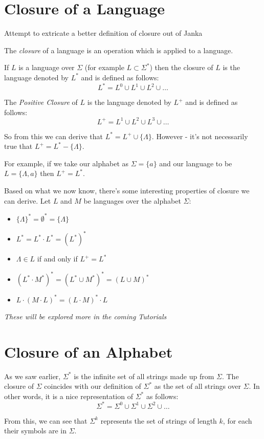 \section{Closure of a Language}
\begin{todo}
Attempt to extricate a better definition of closure out of Janka
\end{todo}

The \textit{closure} of a language is an operation which is applied to a language. 

If $L$ is a language over $\Sigma$ (for example $L \subset \Sigma^*$) then the closure of $L$ is the language denoted by $L^*$ and is defined as follows:
\[L^* = L^0 \cup L^1 \cup L^2 \cup \ldots\]

The \textit{Positive Closure} of $L$ is the language denoted by $L^+$ and is defined as follows:
\[L^+ = L^1 \cup L^2 \cup L^3 \cup \ldots\]

So from this we can derive that $L^* = L^+ \cup \{\Lambda\}$. However - it's not necessarily true that $L^+ = L^* - \{\Lambda\}$. 

For example, if we take our alphabet as $\Sigma = \{a\}$ and our language to be $L = \{\Lambda, a\}$ then $L^+ = L^*$. 

Based on what we now know, there's some interesting properties of closure we can derive. Let $L$ and $M$ be languages over the alphabet $\Sigma$:
\begin{itemize}
    \item $\{\Lambda\}^* = \emptyset^* = \{\Lambda\}$
    \item $L^* = L^* \cdot L^* = (L^*)^*$
    \item $\Lambda \in L$ if and only if $L^+ = L^*$
    \item $(L^* \cdot M^*)^* = (L^* \cup M^*)^* = (L \cup M)^*$
    \item $L \cdot (M \cdot L)^* = (L \cdot M)^* \cdot L$
\end{itemize}

\textit{These will be explored more in the coming Tutorials}

\section{Closure of an Alphabet}
As we saw earlier, $\Sigma^*$ is the infinite set of all strings made up from $\Sigma$. The closure of $\Sigma$ coincides with our definition of $\Sigma^*$ as the set of all strings over $\Sigma$. In other words, it is a nice representation of $\Sigma^*$ as follows:
\[\Sigma^* = \Sigma^0 \cup \Sigma^1 \cup \Sigma^2 \cup \ldots\]

From this, we can see that $\Sigma^k$ represents the set of strings of length $k$, for each their symbols are in $\Sigma$. 